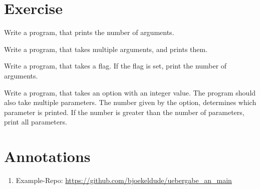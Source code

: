 \documentclass{dcbl/challenge}
\begin{document}
\section*{Exercise}
\begin{aufgabe}
    Write a program, that prints the number of arguments.
\end{aufgabe}

\begin{aufgabe}
    Write a program, that takes multiple arguments, and prints them.
\end{aufgabe}

\begin{aufgabe}
    Write a program, that takes a flag.
    If the flag is set, print the number of arguments.
\end{aufgabe}

\begin{aufgabe}
    Write a program, that takes an option with an integer value.
    The program should also take multiple parameters. 
    The number given by the option, determines which parameter is printed.
    If the number is greater than the number of parameters, print all parameters.
\end{aufgabe}

\section*{Annotations}
\begin{enumerate}
    \item Example-Repo: \url{https://github.com/bjoekeldude/uebergabe_an_main}
\end{enumerate}
\end{document}
